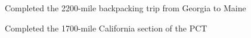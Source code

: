 \documentclass[letterpaper]{deedy-resume} %
\begin{document}
\begin{minipage}[t]{0.66\textwidth}






Completed the 2200-mile backpacking trip from Georgia to Maine

Completed the 1700-mile California section of the PCT

\sectionspace %









\end{minipage}
\end{document}
